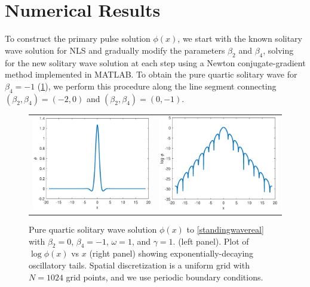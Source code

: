 \documentclass[12pt]{elsarticle}
\begin{document}
\section{Numerical Results}

To construct the primary pulse solution $\phi(x)$, we start with the known solitary wave solution for NLS and gradually modify the parameters $\beta_2$ and $\beta_4$, solving for the new solitary wave solution at each step using a Newton conjugate-gradient method \cite[Chapter 7.2.4]{YangCh7} implemented in MATLAB. To obtain the pure quartic solitary wave for $\beta_4 = -1$ (\cref{fig:PQS}), we perform this procedure along the line segment connecting $(\beta_2, \beta_4) = (-2, 0)$ and $(\beta_2, \beta_4) = (0, -1)$.
\begin{figure}[H]
\centering
\begin{tabular}{cc}
\includegraphics[width=8cm]{images/PQS1.eps} &
\includegraphics[width=8cm]{images/PQS1log.eps}
\end{tabular}
\caption{Pure quartic solitary wave solution $\phi(x)$ to \cref{standingwavereal} with $\beta_2 = 0$, $\beta_4 = -1$, $\omega = 1$, and $\gamma = 1$. (left panel). Plot of $\log \phi(x)$ vs $x$ (right panel) showing exponentially-decaying oscillatory tails. Spatial discretization is a uniform grid with $N = 1024$ grid points, and we use periodic boundary conditions. }
\label{fig:PQS}
\end{figure} 
\end{document}
